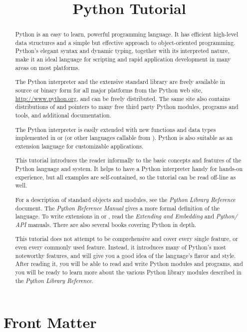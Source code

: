 \documentclass{manual}
\title{Python Tutorial}
\begin{document}
\maketitle

\ifhtml
\chapter*{Front Matter\label{front}}
\fi



\begin{abstract}

\noindent
Python is an easy to learn, powerful programming language.  It has
efficient high-level data structures and a simple but effective
approach to object-oriented programming.  Python's elegant syntax and
dynamic typing, together with its interpreted nature, make it an ideal 
language for scripting and rapid application development in many areas 
on most platforms.

The Python interpreter and the extensive standard library are freely
available in source or binary form for all major platforms from the
Python web site, \url{http://www.python.org}, and can be freely
distributed.  The same site also contains distributions of and
pointers to many free third party Python modules, programs and tools,
and additional documentation.

The Python interpreter is easily extended with new functions and data
types implemented in \C{} or \Cpp{} (or other languages callable from \C{}).
Python is also suitable as an extension language for customizable
applications.

This tutorial introduces the reader informally to the basic concepts
and features of the Python language and system.  It helps to have a
Python interpreter handy for hands-on experience, but all examples are
self-contained, so the tutorial can be read off-line as well.

For a description of standard objects and modules, see the
\emph{Python Library Reference} document.  The \emph{Python Reference
Manual} gives a more formal definition of the language.  To write
extensions in \C{} or \Cpp{}, read the \emph{Extending and Embedding} and
\emph{Python/\C{} API} manuals.  There are also several books covering
Python in depth.

This tutorial does not attempt to be comprehensive and cover every
single feature, or even every commonly used feature.  Instead, it
introduces many of Python's most noteworthy features, and will give
you a good idea of the language's flavor and style.  After reading it,
you will be able to read and write Python modules and programs, and
you will be ready to learn more about the various Python library
modules described in the \emph{Python Library Reference}.

\end{abstract}
\end{document}
